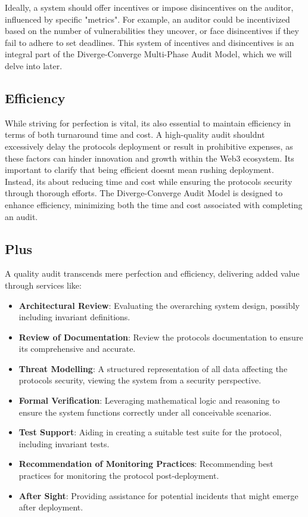 \documentclass[10pt]{extarticle}
\begin{document}
Ideally, a system should offer incentives or impose disincentives on the
auditor, influenced by specific "metrics". For example, an auditor could
be incentivized based on the number of vulnerabilities they uncover, or
face disincentives if they fail to adhere to set deadlines. This system
of incentives and disincentives is an integral part of the
Diverge-Converge Multi-Phase Audit Model, which we will delve into
later.

\subsection{Efficiency}\label{22-efficiency}

While striving for perfection is vital, it\textquotesingle s also
essential to maintain efficiency in terms of both turnaround time and
cost. A high-quality audit shouldn\textquotesingle t excessively delay
the protocol\textquotesingle s deployment or result in prohibitive
expenses, as these factors can hinder innovation and growth within the
Web3 ecosystem. It\textquotesingle s important to clarify that being
efficient doesn\textquotesingle t mean rushing deployment. Instead,
it\textquotesingle s about reducing time and cost while ensuring the
protocol\textquotesingle s security through thorough efforts. The
Diverge-Converge Audit Model is designed to enhance efficiency,
minimizing both the time and cost associated with completing an audit.

\subsection{ Plus}\label{23-plus}

A quality audit transcends mere perfection and efficiency, delivering
added value through services like:

\begin{itemize}
\item
  \textbf{Architectural Review}: Evaluating the overarching system
  design, possibly including invariant definitions.
\item
  \textbf{Review of Documentation}: Review the
  protocol\textquotesingle s documentation to ensure
  it\textquotesingle s comprehensive and accurate.
\item
  \textbf{Threat Modelling}: A structured representation of all data
  affecting the protocol\textquotesingle s security, viewing the system
  from a security perspective.
\item
  \textbf{Formal Verification}: Leveraging mathematical logic and
  reasoning to ensure the system functions correctly under all
  conceivable scenarios.
\item
  \textbf{Test Support}: Aiding in creating a suitable test suite for
  the protocol, including invariant tests.
\item
  \textbf{Recommendation of Monitoring Practices}: Recommending best
  practices for monitoring the protocol post-deployment.
\item
  \textbf{After Sight}: Providing assistance for potential incidents
  that might emerge after deployment.
\end{itemize}
\end{document}
